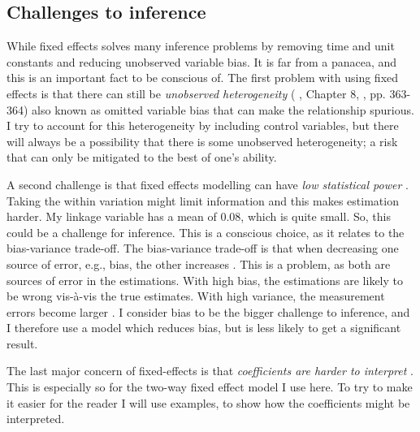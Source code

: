 \subsection{Challenges to inference}
While fixed effects solves many inference problems by removing time and unit constants and reducing unobserved variable bias. It is far from a panacea, and this is an important fact to be conscious of. The first problem with using fixed effects is that there can still be \textit{unobserved heterogeneity} (\citeauthor{cunningham_causal_2021} \citeyear{cunningham_causal_2021}, Chapter 8, \citeauthor{hill_limitations_2020} \citeyear{hill_limitations_2020}, pp. 363-364) also known as omitted variable bias that can make the relationship spurious. I try to account for this heterogeneity by including control variables, but there will always be a possibility that there is some unobserved heterogeneity; a risk that can only be mitigated to the best of one's ability.

A second challenge is that fixed effects modelling can have \textit{low statistical power} \citep[pp. 361-362]{hill_limitations_2020}. Taking the within variation might limit information and this makes estimation harder. My linkage variable has a mean of 0.08, which is quite small. So, this could be a challenge for inference. This is a conscious choice, as it relates to the bias-variance trade-off. The bias-variance trade-off is that when decreasing one source of error, e.g., bias, the other increases \citep[pp. 37-38]{hastie_elements_2009}. This is a problem, as both are sources of error in the estimations. With high bias, the estimations are likely to be wrong vis-à-vis the true estimates. With high variance, the measurement errors become larger \citep[pp. 37-38]{hastie_elements_2009}. I consider bias to be the bigger challenge to inference, and I therefore use a model which reduces bias, but is less likely to get a significant result.

The last major concern of fixed-effects is that \textit{coefficients are harder to interpret} \citep[pp. 364-365]{hill_limitations_2020}. This is especially so for the two-way fixed effect model I use here. To try to make it easier for the reader I will use examples, to show how the coefficients might be interpreted.

